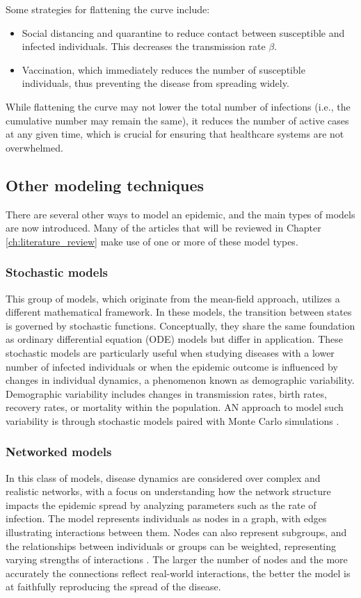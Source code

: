 Some strategies for flattening the curve include:
\begin{itemize}
	\item Social distancing and quarantine to reduce contact between susceptible and infected individuals. This decreases the transmission rate $\beta$.
	\item Vaccination, which immediately reduces the number of susceptible individuals, thus preventing the disease from spreading widely.
\end{itemize}
While flattening the curve may not lower the total number of infections (i.e., the cumulative number may remain the same), it reduces the number of active cases at any given time, which is crucial for ensuring that healthcare systems are not overwhelmed.


\subsection{Other modeling techniques}
There are several other ways to model an epidemic, and the main types of models are now introduced. Many of the articles that will be reviewed in Chapter \ref{ch:literature_review} make use of one or more of these model types.
\subsubsection{Stochastic models} 	
This group of models, which originate from the mean-field approach, utilizes a different mathematical framework. In these models, the transition between states is governed by stochastic functions. Conceptually, they share the same foundation as ordinary differential equation (ODE) models but differ in application. These stochastic models are particularly useful when studying diseases with a lower number of infected individuals or when the epidemic outcome is influenced by changes in individual dynamics, a phenomenon known as demographic variability. Demographic variability includes changes in transmission rates, birth rates, recovery rates, or mortality within the population.
AN approach to model such variability is through stochastic models paired with Monte Carlo simulations \cite{Allen2017}.

\subsubsection{Networked models}
In this class of models, disease dynamics are considered over complex and realistic networks, with a focus on understanding how the network structure impacts the epidemic spread by analyzing parameters such as the rate of infection. The model represents individuals as nodes in a graph, with edges illustrating interactions between them. Nodes can also represent subgroups, and the relationships between individuals or groups can be weighted, representing varying strengths of interactions \cite{Newman2002,VanMieghem2009}. The larger the number of nodes and the more accurately the connections reflect real-world interactions, the better the model is at faithfully reproducing the spread of the disease.


